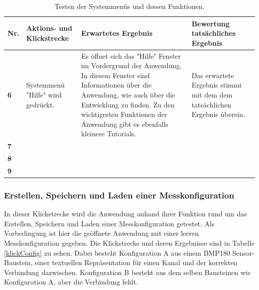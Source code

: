 \documentclass[parskip=full]{scrartcl}
\begin{document}
	\begin{table}[h]
\begin{tabular}{| p{} | p{} | p{} | p{} |}
	\hline
	\textbf{Nr.} & \textbf{Aktions- und Klickstrecke} & \textbf{Erwartetes Ergebnis}  & \textbf{ Bewertung tatsächliches Ergebnis} \\ \hline

	\textbf{6}
	& 
	Systemmenü "Hilfe" wird gedrückt.
	&
	Es öffnet sich das "Hilfe" Fenster im Vordergrund der Anwendung. In diesem Fenster sind Informationen über die 				Anwendung, wie auch über die Entwicklung zu finden. Zu den wichtigesten Funktionen der Anwendung gibt es ebenfalls 			kleinere Tutorials.
	& 
	Das erwartete Ergebnis stimmt mit dem dem tatsächlichen Ergebnis überein.
	\\ \hline

	\textbf{7}
	& 
	
	&
	
	& 
	
	\\ \hline

	\textbf{8}
	& 
	
	&
	
	& 
	
	\\ \hline

	\textbf{9}
	& 
	
	&
	
	& 
	
	\\ \hline
	
\end{tabular}
\caption{Testen der Systemmenüs und dessen Funktionen.}
\label{klickMenu}
\end{table} 

\subsubsection{Erstellen, Speichern und Laden einer Messkonfiguration}

In dieser Klickstrecke wird die Anwendung anhand ihrer Funktion rund um das Erstellen, Speichern und Laden einer Messkonfiguration getestet. Als Vorbedingung ist hier die geöffnete Anwendung mit einer leeren Messkonfiguration gegeben. Die Klickstrecke und deren Ergebnisse sind in Tabelle \ref{klickConfig} zu sehen. Dabei besteht Konfiguration A aus einem BMP180 Sensor-Baustein, einer textuellen Repräsentation für einen Kanal und der korrekten Verbindung dazwischen. Konfiguration B besteht aus dem selben Bausteinen wie Konfiguration A, aber die Verbindung fehlt.  
\end{document}
